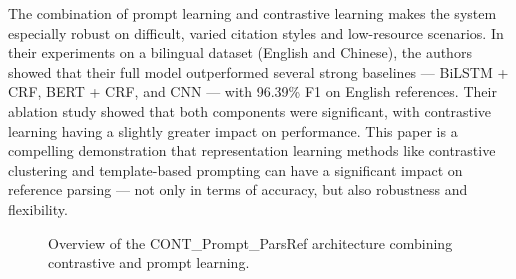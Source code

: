 The combination of prompt learning and contrastive learning makes the system especially robust on difficult, varied citation styles and low-resource scenarios. In their experiments on a bilingual dataset (English and Chinese), the authors showed that their full model outperformed several strong baselines — BiLSTM + CRF, BERT + CRF, and CNN — with 96.39\% F1 on English references. Their ablation study showed that both components were significant, with contrastive learning having a slightly greater impact on performance.
This paper is a compelling demonstration that representation learning methods like contrastive clustering and template-based prompting can have a significant impact on reference parsing — not only in terms of accuracy, but also robustness and flexibility.
\begin{figure}[ht]
    \centering
    
    \caption[\texttt{CONT\_Prompt\_ParsRef}: contrastive and prompt learning architecture]{Overview of the CONT\_Prompt\_ParsRef architecture combining contrastive and prompt learning.}
    \label{fig:contrastive-learning}
\end{figure}

